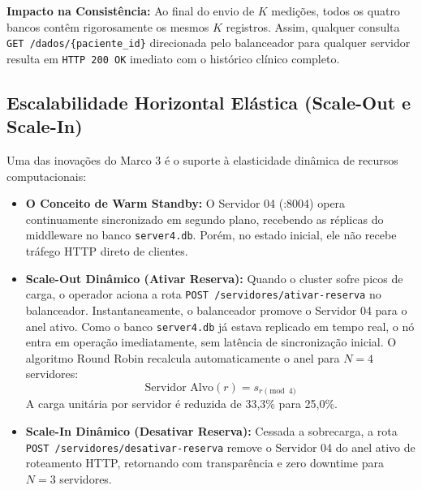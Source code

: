 \documentclass[12pt,a4paper]{article}
\begin{document}
	\textbf{Impacto na Consistência:} Ao final do envio de $K$ medições, todos os quatro bancos contêm rigorosamente os mesmos $K$ registros. Assim, qualquer consulta \texttt{GET /dados/\{paciente\_id\}} direcionada pelo balanceador para qualquer servidor resulta em \texttt{HTTP 200 OK} imediato com o histórico clínico completo.
	
	\subsection{Escalabilidade Horizontal Elástica (Scale-Out e Scale-In)}
	Uma das inovações do Marco 3 é o suporte à elasticidade dinâmica de recursos computacionais:
	\begin{itemize}
		\item \textbf{O Conceito de Warm Standby:} O Servidor 04 (:8004) opera continuamente sincronizado em segundo plano, recebendo as réplicas do middleware no banco \texttt{server4.db}. Porém, no estado inicial, ele não recebe tráfego HTTP direto de clientes.
		\item \textbf{Scale-Out Dinâmico (Ativar Reserva):} Quando o cluster sofre picos de carga, o operador aciona a rota \texttt{POST /servidores/ativar-reserva} no balanceador. Instantaneamente, o balanceador promove o Servidor 04 para o anel ativo. Como o banco \texttt{server4.db} já estava replicado em tempo real, o nó entra em operação imediatamente, sem latência de sincronização inicial. O algoritmo Round Robin recalcula automaticamente o anel para $N=4$ servidores:
		\begin{equation}
			\text{Servidor Alvo}(r) = s_{r \pmod 4}
		\end{equation}
		A carga unitária por servidor é reduzida de 33,3\% para 25,0\%.
		\item \textbf{Scale-In Dinâmico (Desativar Reserva):} Cessada a sobrecarga, a rota \texttt{POST /servidores/desativar-reserva} remove o Servidor 04 do anel ativo de roteamento HTTP, retornando com transparência e zero downtime para $N=3$ servidores.
	\end{itemize}
	
\end{document}
